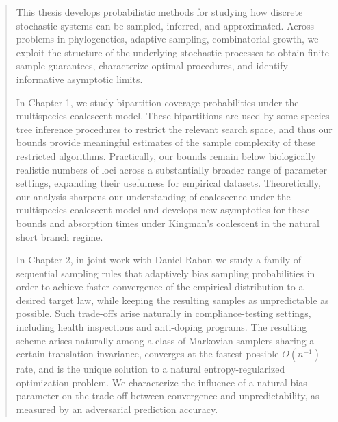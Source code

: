 
\begin{abstract}


\noindent This thesis develops probabilistic methods for studying how discrete stochastic systems can be
sampled, inferred, and approximated. Across problems in phylogenetics, adaptive sampling, combinatorial
growth, we exploit the structure of the underlying stochastic processes to obtain
finite-sample guarantees, characterize optimal procedures, and identify informative asymptotic limits.

\noindent In Chapter 1, we study bipartition coverage probabilities under the multispecies coalescent model. 
These bipartitions are used by some species-tree inference procedures to restrict the relevant search space,
and thus our bounds provide meaningful estimates of the sample complexity of these restricted algorithms. 
Practically, our bounds remain below biologically realistic numbers of loci across a substantially broader range of parameter 
settings, expanding their usefulness for empirical datasets. Theoretically, our analysis sharpens
our understanding of coalescence under the multispecies coalescent model and develops new asymptotics for these bounds
and absorption times under Kingman's coalescent in the natural short branch regime.


\noindent In Chapter 2, in joint work with Daniel Raban we study a family of sequential sampling rules 
that adaptively bias sampling probabilities in order to achieve faster convergence of the empirical distribution 
to a desired target law, while keeping the resulting samples as unpredictable as possible. Such trade-offs arise naturally 
in compliance-testing settings, including health inspections and anti-doping programs. The resulting scheme 
arises naturally among a class of Markovian samplers sharing a certain translation-invariance, converges at the fastest
possible $O(n^{-1})$ rate, and is the unique solution to a natural entropy-regularized optimization problem.
We characterize the influence of a natural bias parameter on the trade-off between convergence and unpredictability,
as measured by an adversarial prediction accuracy.


\end{abstract}
